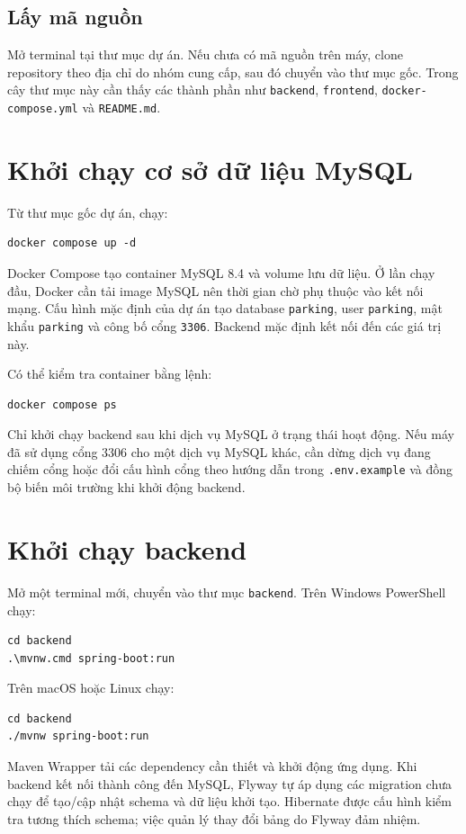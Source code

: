 \subsection{Lấy mã nguồn}
Mở terminal tại thư mục dự án. Nếu chưa có mã nguồn trên máy, clone repository theo địa chỉ do nhóm cung cấp, sau đó chuyển vào thư mục gốc. Trong cây thư mục này cần thấy các thành phần như \texttt{backend}, \texttt{frontend}, \texttt{docker-compose.yml} và \texttt{README.md}.

\section{Khởi chạy cơ sở dữ liệu MySQL}

Từ thư mục gốc dự án, chạy:
\begin{verbatim}
docker compose up -d
\end{verbatim}

Docker Compose tạo container MySQL 8.4 và volume lưu dữ liệu. Ở lần chạy đầu, Docker cần tải image MySQL nên thời gian chờ phụ thuộc vào kết nối mạng. Cấu hình mặc định của dự án tạo database \texttt{parking}, user \texttt{parking}, mật khẩu \texttt{parking} và công bố cổng \texttt{3306}. Backend mặc định kết nối đến các giá trị này.

Có thể kiểm tra container bằng lệnh:
\begin{verbatim}
docker compose ps
\end{verbatim}

Chỉ khởi chạy backend sau khi dịch vụ MySQL ở trạng thái hoạt động. Nếu máy đã sử dụng cổng 3306 cho một dịch vụ MySQL khác, cần dừng dịch vụ đang chiếm cổng hoặc đổi cấu hình cổng theo hướng dẫn trong \texttt{.env.example} và đồng bộ biến môi trường khi khởi động backend.

\section{Khởi chạy backend}

Mở một terminal mới, chuyển vào thư mục \texttt{backend}. Trên Windows PowerShell chạy:
\begin{verbatim}
cd backend
.\mvnw.cmd spring-boot:run
\end{verbatim}

Trên macOS hoặc Linux chạy:
\begin{verbatim}
cd backend
./mvnw spring-boot:run
\end{verbatim}

Maven Wrapper tải các dependency cần thiết và khởi động ứng dụng. Khi backend kết nối thành công đến MySQL, Flyway tự áp dụng các migration chưa chạy để tạo/cập nhật schema và dữ liệu khởi tạo. Hibernate được cấu hình kiểm tra tương thích schema; việc quản lý thay đổi bảng do Flyway đảm nhiệm.

